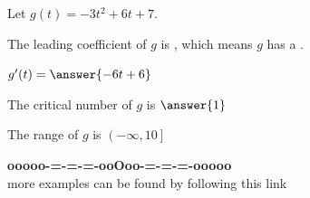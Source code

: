 \documentclass{ximera}
\begin{document}
\begin{question} 


Let $g(t) = -3 t^2 + 6 t + 7$.



The leading coefficient of $g$ is , which means $g$ has a .



$g'(t) = \answer{-6t+6}$



The critical number of $g$ is $\answer{1}$




The range of $g$ is $\left( -\infty, 10 \right]$


\end{question}


























\begin{onlineOnly}
\begin{center}
\textbf{\textcolor{green!50!black}{ooooo-=-=-=-ooOoo-=-=-=-ooooo}} \\

more examples can be found by following this link\\ 

\end{center}
\end{onlineOnly}
\end{document}
